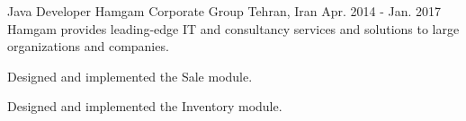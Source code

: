 \begin{cventries}
  \cventry
    {Java Developer} %
    {Hamgam Corporate Group} %
    {Tehran, Iran} %
    {Apr. 2014 - Jan. 2017} %
    {
      Hamgam provides leading-edge IT and consultancy services and solutions to large organizations and companies.
    }
    {
      \begin{cvitems} %
        \item {Designed and implemented the Sale module.}
        \item {Designed and implemented the Inventory module.}
      \end{cvitems}
    }

\end{cventries}
